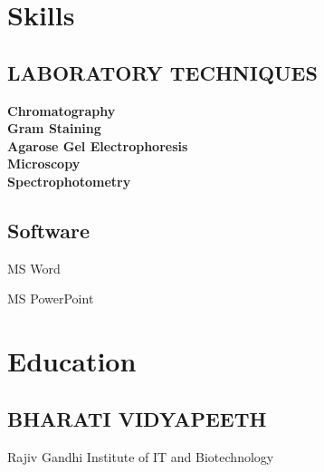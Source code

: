 \documentclass[]{kajalverse-resume}
\begin{document}
\begin{minipage}[t]{0.33\textwidth}


\section{Skills}
{\subsection{LABORATORY TECHNIQUES}
}


\textbullet{} \textbf{Chromatography} \\
\textbullet{} \textbf{Gram Staining} \\
\textbullet{} \textbf{Agarose Gel Electrophoresis} \\
\textbullet\textbf{Microscopy}  \\
\textbullet\textbf{Spectrophotometry}  \\



\vspace{0.3cm}\subsection{Software}
\textbullet{}MS Word 

\textbullet{}MS PowerPoint \\
\sectionsep


\section{Education}

\subsection{BHARATI VIDYAPEETH }


Rajiv Gandhi Institute of IT and Biotechnology\\
\sectionsep


\end{minipage}
\end{document}
